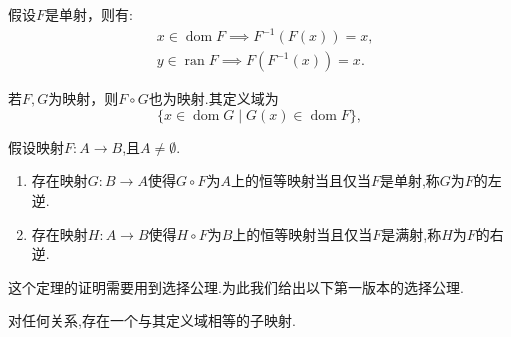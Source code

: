 \begin{theorem}
    [单射的性质]
    假设$F$是单射，则有:
    \begin{align*}
        &x\in\operatorname{dom}F\implies F^{-1}\left(F(x)\right)=x,\\
        &y\in\operatorname{ran}F\implies F\left(F^{-1}(x)\right)=x.
    \end{align*}
\end{theorem}

\begin{theorem}
    [集合范畴的映射对复合封闭]
    若$F,G$为映射，则$F\circ G$也为映射.其定义域为
    \[\{x\in\operatorname{dom}G\mid G(x)\in\operatorname{dom}F\},\]
\end{theorem}

\begin{theorem}
    [映射左右逆的存在性]
    假设映射$F:A\rightarrow B$,且$A\ne\emptyset$.
    \begin{enumerate}
        \item 存在映射$G:B\rightarrow A$使得$G\circ F$为$A$上的恒等映射当且仅当$F$是单射,称$G$为$F$的左逆.
        \item 存在映射$H:A\rightarrow B$使得$H\circ F$为$B$上的恒等映射当且仅当$F$是满射,称$H$为$F$的右逆.
        \end{enumerate}
\end{theorem}

这个定理的证明需要用到选择公理.为此我们给出以下第一版本的选择公理.
\begin{axiom}
    [选择公理第一版]
    对任何关系,存在一个与其定义域相等的子映射.
\end{axiom}


